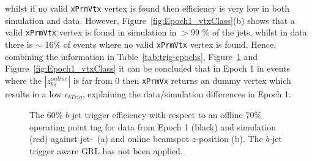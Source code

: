 whilst if no valid \verb|xPrmVtx| vertex is found then efficiency is very low in both simulation and data.
However, Figure~\ref{fig:Epoch1_vtxClass}(b) shows that a valid \verb|xPrmVtx| vertex is found in simulation in $> 99$ \% of the jets,
whilst in data there is $\sim$ 16\% of events where no valid \verb|xPrmVtx| vertex is found.
Hence, combining the information in Table~\ref{tab:trig-epochs}, Figure~\ref{fig:Epoch1_eff} and Figure~\ref{fig:Epoch1_vtxClass}
it can be concluded that in Epoch 1 in events where the  $|z_{bs}^{online}|$ is far from 0
then \verb|xPrmVx| returns an dummy vertex which results in a low $\epsilon_{bTrig}$, explaining the data/simulation differences in Epoch 1. 

\begin{figure}[!ht]
  \begin{center}
    \captionsetup[subfigure]{aboveskip=0pt,justification=centering}
  \end{center}
  \caption{The 60\% $b$-jet trigger efficiency with respect to an offline 70\% operating point tag
    for data from Epoch 1 (black) and simulation (red) against jet-\pT~(a) and online beamspot $z$-position (b).
    The $b$-jet trigger aware GRL has not been applied.}
  \label{fig:Epoch1_eff}
  \begin{center}
    \captionsetup[subfigure]{aboveskip=0pt,justification=centering}

\end{center}
\end{figure}
